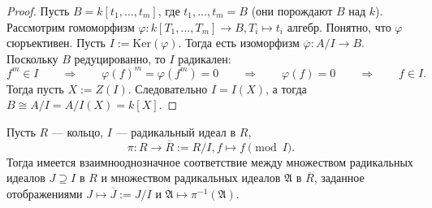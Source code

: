 \documentclass[12pt,a4paper]{article}
\newcommand{\Ker}{\mathrm{Ker}}
\begin{document}
    \begin{proof}
        Пусть $B = k[t_1, \dots, t_m]$, где $t_1, \dots, t_m = B$ (они порождают $B$ над $k$). Рассмотрим гомоморфизм $\varphi: k[T_1, \dots, T_m] \to B, T_i \mapsto t_i$ алгебр. Понятно, что $\varphi$ сюръективен. Пусть $I := \Ker(\varphi)$. Тогда есть изоморфизм $\overline{\varphi}: A/I \to B$. Поскольку $B$ редуцированно, то $I$ радикален:
        \[
            f^m \in I
            \qquad \Longrightarrow \qquad
            \varphi(f)^m = \varphi(f^m) = 0
            \qquad \Longrightarrow \qquad
            \varphi(f) = 0
            \qquad \Longrightarrow \qquad
            f \in I.
        \]
        Тогда пусть $X := Z(I)$. Следовательно $I = I(X)$, а тогда $B \cong A/I = A/I(X) = k[X]$.
    \end{proof}

    \begin{lemma}
        Пусть $R$ --- кольцо, $I$ --- радикальный идеал в $R$,
        \[\pi: R \to \overline{R} := R/I, f \mapsto f \pmod{I}.\]
        Тогда имеется взаимнооднозначное соответствие между множеством радикальных идеалов $J \supseteq I$ в $R$ и множеством радикальных идеалов $\mathfrak{A}$ в $\overline{R}$, заданное отображениями $J \mapsto \overline{J} := J/I$ и $\mathfrak{A} \mapsto \pi^{-1}(\mathfrak{A})$.
    \end{lemma}
\end{document}
